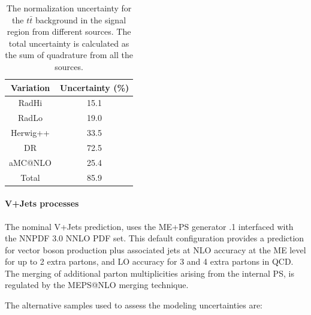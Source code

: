 \begin{table}[htbp!]
\begin{center}
\begin{tabular}{c|c}
Variation   &  Uncertainty (\%) \\
\hline
RadHi       &               15.1 \\
RadLo       &               19.0 \\
Herwig++    &               33.5 \\
DR          &               72.5 \\
aMC@NLO     &               25.4 \\
\hline
Total      &                85.9 \\
\end{tabular}
\end{center}
\caption{The normalization uncertainty for the $t\bar{t}$ background in the signal region
from different sources. The total uncertainty is calculated as the sum of quadrature from all
the sources.}
\label{tab:boosted_unc_singletopwt}
\end{table}
 
\FloatBarrier
 
 
\paragraph{V+Jets processes}
\label{sec:boosted_syst_modeling_vjets}
 
The nominal V+Jets prediction, uses the ME+PS generator .1 interfaced with the NNPDF 3.0 NNLO PDF set.
This default configuration provides a prediction for vector boson production plus associated jets at NLO accuracy
at the ME level for up to 2 extra partons, and LO accuracy for 3 and 4 extra partons in QCD.
The merging of additional parton multiplicities arising from the internal \SHERPA PS, is regulated by the
MEPS@NLO merging technique.
 
The alternative samples used to assess the modeling uncertainties are:
 
